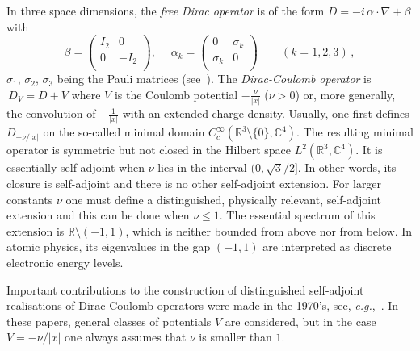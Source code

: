 \documentclass[12pt,reqno]{amsart}
\newcommand{\R}{{\mathbb R}}
\newcommand{\C}{{\mathbb C}}
\renewcommand{\(}{\left(}
\renewcommand{\)}{\right)}
\begin{document}
In three space dimensions, the {\it free Dirac operator} is of the form $D=-i\,\alpha\cdot\nabla+\beta$ with
\[
 \beta=\left( \begin{matrix} I_2 & 0 \\ 0 & -I_2 \\ \end{matrix} \right),\quad \; \alpha_k=\left( \begin{matrix}
0 &\sigma_k \\ \sigma_k &0 \\ \end{matrix}\right)  \qquad (k=1, 2, 3)\,,
\]
$\sigma_1,\,\sigma_2,\,\sigma_3$ being the Pauli matrices (see~\cite{thaller}). The {\it Dirac-Coulomb operator} is $\,D_V=D+V$ where $V$ is the Coulomb potential $-\frac{\nu}{|x|}$ ($\nu>0$) or, more generally, the convolution of $-\frac{1}{|x|}$ with an extended charge density. Usually, one first defines $D_{-\nu/|x|}$ on the so-called minimal domain $C^\infty_c(\R^3\setminus\{0\},\C^4)$. The resulting minimal operator is symmetric but not closed in the Hilbert space $L^2(\R^3,\C^4)$. It is essentially self-adjoint when $\nu$ lies in the interval $(0,\sqrt{3}/{2}]$. In other words, its closure is self-adjoint and there is no other self-adjoint extension. For larger constants $\nu$ one must define a distinguished, physically relevant, self-adjoint extension and this can be done when $\nu\leq 1$. The essential spectrum of this extension is $\R\setminus (-1,1)$, which is neither bounded from above nor from below. In atomic physics, its eigenvalues in the gap $(-1,1)$ are interpreted as discrete electronic energy levels.
 
Important contributions to the construction of distinguished self-adjoint realisations of Dirac-Coulomb operators were made in the 1970's, see, {\it e.g.},~\cite{Sch72, Wust-73, Wust-75, Wust-77, Nen76, Nen77, KlaWus-78, Klaus-80b}. In these papers, general classes of potentials $V$ are considered, but in the case $V=-\nu/|x|$ one always assumes that $\nu$ is smaller than $1$.
 
\end{document}
